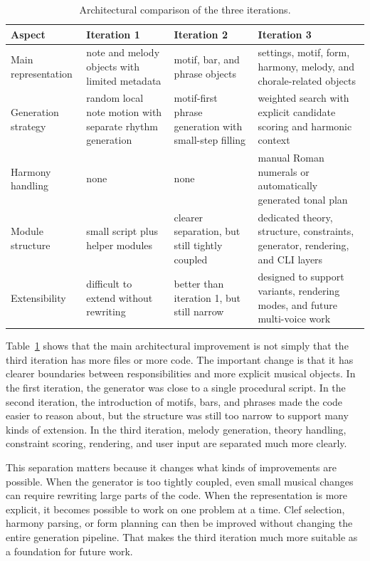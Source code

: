   \begin{table}[h]
    \centering
    \small
    \begin{tabular}{p{}p{}p{}p{}}
      \toprule
      Aspect & Iteration 1 & Iteration 2 & Iteration 3 \\
      \midrule
      Main representation & note and melody objects with limited metadata & motif, bar, and phrase objects & settings, motif, form, harmony, melody, and chorale-related objects \\
      Generation strategy & random local note motion with separate rhythm generation & motif-first phrase generation with small-step filling & weighted search with explicit candidate scoring and harmonic context \\
      Harmony handling & none & none & manual Roman numerals or automatically generated tonal plan \\
      Module structure & small script plus helper modules & clearer separation, but still tightly coupled & dedicated theory, structure, constraints, generator, rendering, and CLI layers \\
      Extensibility & difficult to extend without rewriting & better than iteration 1, but still narrow & designed to support variants, rendering modes, and future multi-voice work \\
      \bottomrule
    \end{tabular}
    \caption{Architectural comparison of the three iterations.}\label{tab:iteration_architecture_comparison}
  \end{table}

  Table~\ref{tab:iteration_architecture_comparison} shows that the main architectural improvement is not simply that the third iteration has more files or more code. The important change is that it has clearer boundaries between responsibilities and more explicit musical objects. In the first iteration, the generator was close to a single procedural script. In the second iteration, the introduction of motifs, bars, and phrases made the code easier to reason about, but the structure was still too narrow to support many kinds of extension. In the third iteration, melody generation, theory handling, constraint scoring, rendering, and user input are separated much more clearly.

  This separation matters because it changes what kinds of improvements are possible. When the generator is too tightly coupled, even small musical changes can require rewriting large parts of the code. When the representation is more explicit, it becomes possible to work on one problem at a time. Clef selection, harmony parsing, or form planning can then be improved without changing the entire generation pipeline. That makes the third iteration much more suitable as a foundation for future work.

